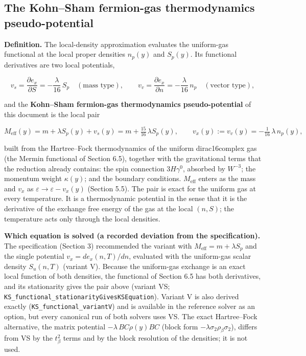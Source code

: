 \documentclass[11pt]{article}
\begin{document}
\subsection{The Kohn--Sham fermion-gas thermodynamics pseudo-potential}

\textbf{Definition.} The local-density approximation evaluates the uniform-gas functional at the local proper densities $n_p(y)$ and $S_p(y)$. Its functional derivatives are two local potentials,

\[
v_s=\frac{\partial e_x}{\partial S}=-\frac{\lambda}{16}\,S_p\quad(\text{mass type}),\qquad v_v=\frac{\partial e_x}{\partial n}=-\frac{\lambda}{16}\,n_p\quad(\text{vector type}),
\]

and the \textbf{Kohn--Sham fermion-gas thermodynamics pseudo-potential} of this document is the local pair

\[
M_{\mathrm{eff}}(y)=m+\lambda S_p(y)+v_s(y)=m+\tfrac{15}{16}\,\lambda S_p(y),\qquad v_x(y):=v_v(y)=-\tfrac1{16}\,\lambda\,n_p(y),
\]

built from the Hartree--Fock thermodynamics of the uniform dirac16complex gas (the Mermin functional of Section 6.5), together with the gravitational terms that the reduction already contains: the spin connection $3H\gamma^0$, absorbed by $W^{-3}$; the momentum weight $\kappa(y)$; and the boundary conditions. $M_{\mathrm{eff}}$ enters as the mass and $v_x$ as $\varepsilon\to\varepsilon-v_x(y)$ (Section 5.5). The pair is exact for the uniform gas at every temperature. It is a thermodynamic potential in the sense that it is the derivative of the exchange free energy of the gas at the local $(n,S)$; the temperature acts only through the local densities.

\textbf{Which equation is solved (a recorded deviation from the specification).} The specification (Section 3) recommended the variant with $M_{\mathrm{eff}}=m+\lambda S_p$ and the single potential $v_x=de_x(n,T)/dn$, evaluated with the uniform-gas scalar density $S_u(n,T)$ (variant V). Because the uniform-gas exchange is an exact local function of both densities, the functional of Section 6.5 has both derivatives, and its stationarity gives the pair above (variant VS; \texttt{KS\_funct\allowbreak{}ional\_st\allowbreak{}ationari\allowbreak{}tyGivesK\allowbreak{}SEquatio\allowbreak{}n}). Variant V is also derived exactly (\texttt{KS\_funct\allowbreak{}ional\_va\allowbreak{}riantV}) and is available in the reference solver as an option, but every canonical run of both solvers uses VS. The exact Hartree--Fock alternative, the matrix potential $-\lambda\,BC\rho(y)BC$ (block form $-\lambda\sigma_2\rho_\beta\sigma_2$), differs from VS by the $t_\beta^2$ terms and by the block resolution of the densities; it is not used.
\end{document}
